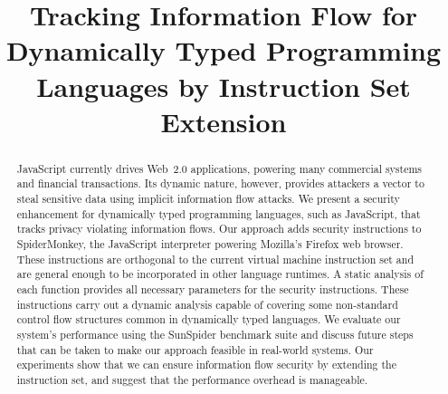 \documentclass[preprint]{sigplanconf}
\begin{document}
\copyrightdata{[to be supplied]} 

\title{Tracking Information Flow for Dynamically Typed Programming Languages by Instruction Set Extension}

\newcommand{\Sa}{{\Large$^\ast$}}
\newcommand{\Sb}{{\Large$^\dag$}}


\maketitle

\begin{abstract}

JavaScript currently drives Web~2.0 applications, powering many commercial systems and financial transactions.
Its dynamic nature, however, provides attackers a vector to steal sensitive data using implicit information flow attacks.
We present a security enhancement for dynamically typed programming languages, such as JavaScript, that tracks privacy violating information flows.
Our approach adds security instructions to SpiderMonkey, the JavaScript interpreter powering Mozilla's Firefox web browser.
These instructions are orthogonal to the current virtual machine instruction set and are general enough to be incorporated in other language runtimes.
A static analysis of each function provides all necessary parameters for the security instructions.
These instructions carry out a dynamic analysis capable of covering some non-standard control flow structures common in dynamically typed languages.
We evaluate our system's performance using the SunSpider benchmark suite and discuss future steps that can be taken to make our approach feasible in real-world systems.
Our experiments show that we can ensure information flow security by extending the instruction set, and suggest that the performance overhead is manageable.

\end{abstract}
\end{document}
